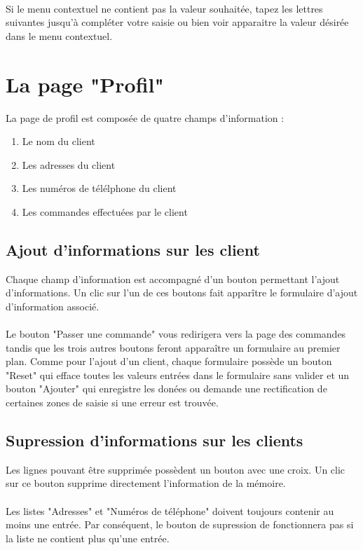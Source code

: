 \paragraph{}
Si le menu contextuel ne contient pas la valeur souhaitée, tapez les lettres
suivantes jusqu'à compléter votre saisie ou bien voir apparaitre la valeur
désirée dans le menu contextuel.

\section{La page "Profil"}
La page de profil est composée de quatre champs d'information :

\begin{enumerate}
  \item Le nom du client
  \item Les adresses du client
  \item Les numéros de télélphone du client
  \item Les commandes effectuées par le client
\end{enumerate}

\subsection{Ajout d'informations sur les client}
Chaque champ d'information est accompagné d'un bouton permettant l'ajout d'informations.
Un clic sur l'un de ces boutons fait apparître le formulaire d'ajout
d'information associé.

\paragraph{}
Le bouton "Passer une commande" vous redirigera vers la page des commandes
tandis que les trois autres boutons feront apparaître un formulaire au premier
plan. Comme pour l'ajout d'un client, chaque formulaire possède un bouton "Reset"
qui efface toutes les valeurs entrées dans le formulaire sans valider et un
bouton "Ajouter" qui enregistre les donées ou demande une rectification de
certaines zones de saisie si une erreur est trouvée.

\subsection{Supression d'informations sur les clients}
Les lignes pouvant être supprimée possèdent
un bouton avec une croix. Un clic sur ce bouton supprime directement
l'information de la mémoire.

\paragraph{}
Les listes "Adresses" et "Numéros de téléphone" doivent toujours contenir au
moins une entrée. Par conséquent, le bouton de supression de fonctionnera pas
si la liste ne contient plus qu'une entrée.
